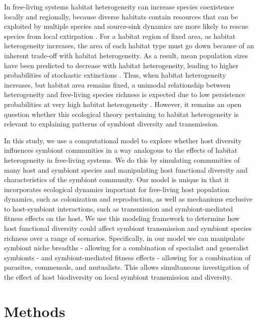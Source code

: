 In free-living systems habitat heterogeneity can increase species coexistence locally and regionally, because diverse habitats contain resources that can be exploited by multiple species and source-sink dynamics are more likely to rescue species from local extirpation \citep{Levins1969,Pacala1982,Amarasekare2004}.
For a habitat region of fixed area, as habitat heterogeneity increases, the area of each habitat type must go down because of an inherent trade-off with habitat heterogeneity.
As a result, mean population sizes have been predicted to decrease with habitat heterogeneity, leading to higher probabilities of stochastic extinctions \citep{Allouche2012}.
Thus, when habitat heterogeneity increases, but habitat area remains fixed, a unimodal relationship between heterogeneity and free-living species richness is expected due to low persistence probabilities at very high habitat heterogeneity \citep{Allouche2012}.
However, it remains an open question whether this ecological theory pertaining to habitat heterogeneity is relevant to explaining patterns of symbiont diversity and transmission.

In this study, we use a computational model to explore whether host diversity influences symbiont communities in a way analogous to the effects of habitat heterogeneity in free-living systems.
We do this by simulating communities of many host and symbiont species and manipulating host functional diversity and characteristics of the symbiont community.
Our model is unique in that it incorporates ecological dynamics important for free-living host population dynamics, such as colonization and reproduction, as well as mechanisms exclusive to host-symbiont interactions, such as transmission and symbiont-mediated fitness effects on the host.
We use this modeling framework to determine how host functional diversity could affect symbiont transmission and symbiont species richness over a range of scenarios.
Specifically, in our model we can manipulate symbiont niche breadths - allowing for a combination of specialist and generalist symbionts - and symbiont-mediated fitness effects - allowing for a combination of parasites, commensals, and mutualists.
This allows simultaneous investigation of the effect of host biodiversity on local symbiont transmission and diversity.

\section{Methods}

